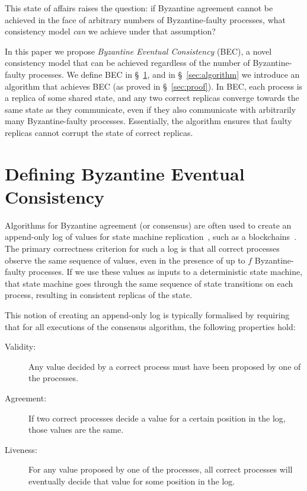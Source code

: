 \documentclass[a4paper,anonymous,USenglish]{lipics-v2019}
\begin{document}
This state of affairs raises the question: if Byzantine agreement cannot be achieved in the face of arbitrary numbers of Byzantine-faulty processes, what consistency model \emph{can} we achieve under that assumption?

In this paper we propose \emph{Byzantine Eventual Consistency} (BEC), a novel consistency model that can be achieved regardless of the number of Byzantine-faulty processes.
We define BEC in \S~\ref{sec:properties}, and in \S~\ref{sec:algorithm} we introduce an algorithm that achieves BEC (as proved in \S~\ref{sec:proof}).
In BEC, each process is a replica of some shared state, and any two correct replicas converge towards the same state as they communicate, even if they also communicate with arbitrarily many Byzantine-faulty processes.
Essentially, the algorithm ensures that faulty replicas cannot corrupt the state of correct replicas.

\section{Defining Byzantine Eventual Consistency}\label{sec:properties}

Algorithms for Byzantine agreement (or consensus) are often used to create an append-only log of values for state machine replication~\cite{Schneider:1990}, such as a blockchains~\cite{Bano:2019}.
The primary correctness criterion for such a log is that all correct processes observe the same sequence of values, even in the presence of up to $f$ Byzantine-faulty processes.
If we use these values as inputs to a deterministic state machine, that state machine goes through the same sequence of state transitions on each process, resulting in consistent replicas of the state.

This notion of creating an append-only log is typically formalised by requiring that for all executions of the consensus algorithm, the following properties hold:

\begin{description}
\item[Validity:] Any value decided by a correct process must have been proposed by one of the processes.
\item[Agreement:] If two correct processes decide a value for a certain position in the log, those values are the same.
\item[Liveness:] For any value proposed by one of the processes, all correct processes will eventually decide that value for some position in the log.
\end{description}
\end{document}

